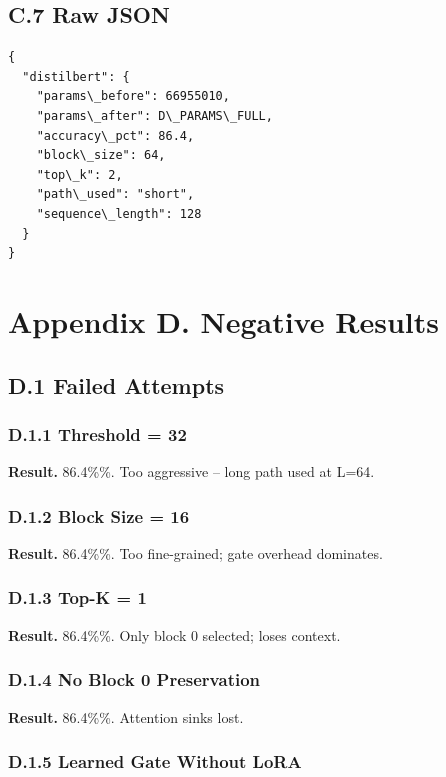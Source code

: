 \subsection{C.7 Raw JSON}

\begin{lstlisting}
{
  "distilbert": {
    "params\_before": 66955010,
    "params\_after": D\_PARAMS\_FULL,
    "accuracy\_pct": 86.4,
    "block\_size": 64,
    "top\_k": 2,
    "path\_used": "short",
    "sequence\_length": 128
  }
}
\end{lstlisting}



\section{Appendix D. Negative Results}

\subsection{D.1 Failed Attempts}

\subsubsection{D.1.1 Threshold = 32}

\textbf{Result.} 86.4\%\%. Too aggressive -- long path used at L=64.

\subsubsection{D.1.2 Block Size = 16}

\textbf{Result.} 86.4\%\%. Too fine-grained; gate overhead dominates.

\subsubsection{D.1.3 Top-K = 1}

\textbf{Result.} 86.4\%\%. Only block 0 selected; loses context.

\subsubsection{D.1.4 No Block 0 Preservation}

\textbf{Result.} 86.4\%\%. Attention sinks lost.

\subsubsection{D.1.5 Learned Gate Without LoRA}

